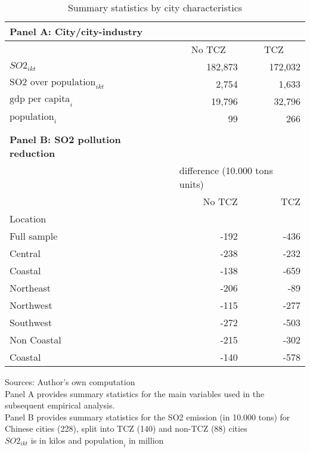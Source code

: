 \documentclass[12pt]{article}
\begin{document}
\begin{table}[!htbp] \centering
    \caption{Summary statistics by city characteristics}
      \begin{adjustbox}{width=\textwidth, totalheight=\baselineskip,keepaspectratio}
    \label{tab:table2}
    \begin{tabular}{lrr}
      \multicolumn{1}{l}{\textbf{\small Panel A: City/city-industry}} \\
      \toprule
      & \multicolumn{1}{c}{No TCZ} & \multicolumn{1}{c}{TCZ} \\
      \midrule
      $SO2_{ikt}$  & 182,873 & 172,032 \\
      $\text{SO2 over population}_{ikt}$ &   2,754 &   1,633 \\
      $\text{gdp per capita}_i$ &  19,796 &  32,796 \\
      $\text{population}_i$ &      99 &     266 \\
      \bottomrule
      \\ %
      \multicolumn{1}{l}{\textbf{\small Panel B: SO2 pollution reduction}} \\
      \toprule
      {} & \multicolumn{2}{l}{\footnotesize difference (10.000 tons units)} \\
                  & No TCZ   & TCZ     \\
      Location    &          &         \\
      \midrule
      Full sample &    -192 & -436  \\
      Central     &    -238 & -232 \\
      Coastal     &    -138 & -659  \\
      Northeast   &    -206 &  -89 \\
      Northwest   &    -115 & -277  \\
      Southwest   &    -272 & -503 \\
      Non Coastal &    -215 & -302  \\
      Coastal     &    -140 & -578  \\
      \bottomrule
      \hline
    \end{tabular}
    \end{adjustbox}
    \begin{tablenotes}
      \small
      \item 
      Sources: Author's own computation \\
      Panel A provides summary statistics for the main variables used in the subsequent empirical analysis. \\
  Panel B provides summary statistics for the SO2 emission (in 10.000 tons) for Chinese cities (228), split into TCZ (140) and non-TCZ (88) cities \\
  $SO2_{ikt}$ is in kilos and $\text{population}_i$ in million
      \\
    \end{tablenotes}
\end{table}
\end{document}
